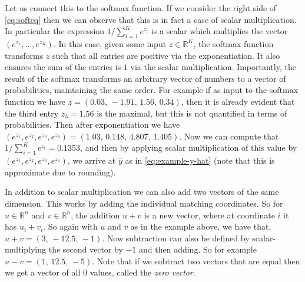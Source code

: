 \documentclass[12pt]{article}
\begin{document}
Let us connect this to the softmax function. If we consider the right side of \eqref{eq:softeq} then we can observe that this is in fact a case of scalar multiplication. In particular the expression $1/\sum_{i=1}^K e^{z_i}$ is a scalar which multiplies the vector $(e^{z_1},\ldots,e^{z_K})$. In this case, given some input $z \in {\mathbb R}^K$, the softmax function transforms $z$ such that all entries are positive via the exponentiation. It also ensures the sum of the entries is $1$ via the scalar multiplication. Importantly, the result of the softmax transforms an arbitrary vector of numbers to a vector of probabilities, maintaining the same order. For example if as input to the softmax function we have $z = (0.03,\, -1.91, \, 1.56, \, 0.34)$, then it is already evident that the third entry $z_3 = 1.56$ is the maximal, but this is not quantified in terms of probabilities. Then after exponentiation we have $(e^{z_1}, e^{z_2}, e^{z_3}, e^{z_4}) = (1.03,\,0.148,\,4.807,\,1.405)$. Now we can compute that $1/\sum_{i=1}^K e^{z_i} = 0.1353$, and then by applying scalar multiplication of this value by $(e^{z_1}, e^{z_2}, e^{z_3}, e^{z_4})$, we arrive at $\hat{y}$ as in \eqref{eq:example-y-hat} (note that this is approximate due to rounding).

In addition to scalar multiplication we can also add two vectors of the same dimension. This works by adding the individual matching coordinates. So for $u \in {\mathbb R}^n$ and $v \in {\mathbb R}^n$, the addition $u+v$ is a new vector, where at coordinate $i$ it has $u_i + v_i$. So again with $u$ and $v$ as in the example above, we have that, $u+v = (3, \, -12.5, \, -1)$. Now subtraction can also be defined by scalar-multiplying the second vector by $-1$ and then adding. So for example $u-v = (1,\, 12.5,\, -5)$. Note that if we subtract two vectors that are equal then we get a vector of all $0$ values, called the {\em zero vector}.
\end{document}
